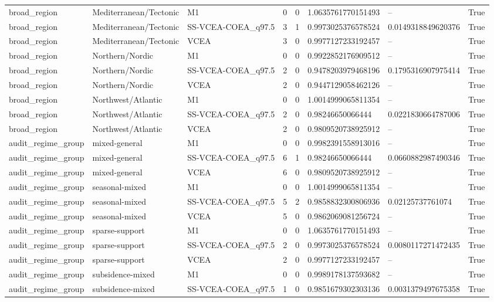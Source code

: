 \begin{landscape}
\begin{longtable}{llllllll}
broad\_region & Mediterranean/Tectonic & M1 & 0 & 0 & 1.0635761770151493 & -- & True \\
broad\_region & Mediterranean/Tectonic & SS-VCEA-COEA\_q97.5 & 3 & 1 & 0.9973025376578524 & 0.0149318849620376 & True \\
broad\_region & Mediterranean/Tectonic & VCEA & 3 & 0 & 0.9977127233192457 & -- & True \\
broad\_region & Northern/Nordic & M1 & 0 & 0 & 0.9922852176909512 & -- & True \\
broad\_region & Northern/Nordic & SS-VCEA-COEA\_q97.5 & 2 & 0 & 0.9478203979468196 & 0.1795316907975414 & True \\
broad\_region & Northern/Nordic & VCEA & 2 & 0 & 0.9447129058462126 & -- & True \\
broad\_region & Northwest/Atlantic & M1 & 0 & 0 & 1.0014999065811354 & -- & True \\
broad\_region & Northwest/Atlantic & SS-VCEA-COEA\_q97.5 & 2 & 0 & 0.98246650066444 & 0.0221830664787006 & True \\
broad\_region & Northwest/Atlantic & VCEA & 2 & 0 & 0.9809520738925912 & -- & True \\
audit\_regime\_group & mixed-general & M1 & 0 & 0 & 0.9982391558913016 & -- & True \\
audit\_regime\_group & mixed-general & SS-VCEA-COEA\_q97.5 & 6 & 1 & 0.98246650066444 & 0.0660882987490346 & True \\
audit\_regime\_group & mixed-general & VCEA & 6 & 0 & 0.9809520738925912 & -- & True \\
audit\_regime\_group & seasonal-mixed & M1 & 0 & 0 & 1.0014999065811354 & -- & True \\
audit\_regime\_group & seasonal-mixed & SS-VCEA-COEA\_q97.5 & 5 & 2 & 0.9858832300806936 & 0.02125737761074 & True \\
audit\_regime\_group & seasonal-mixed & VCEA & 5 & 0 & 0.9862069081256724 & -- & True \\
audit\_regime\_group & sparse-support & M1 & 0 & 0 & 1.0635761770151493 & -- & True \\
audit\_regime\_group & sparse-support & SS-VCEA-COEA\_q97.5 & 2 & 0 & 0.9973025376578524 & 0.0080117271472435 & True \\
audit\_regime\_group & sparse-support & VCEA & 2 & 0 & 0.9977127233192457 & -- & True \\
audit\_regime\_group & subsidence-mixed & M1 & 0 & 0 & 0.9989178137593682 & -- & True \\
audit\_regime\_group & subsidence-mixed & SS-VCEA-COEA\_q97.5 & 1 & 0 & 0.9851679302303136 & 0.0031379497675358 & True \\

\end{longtable}
\end{landscape}
